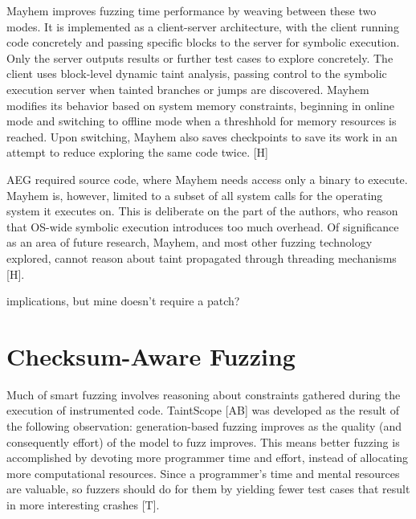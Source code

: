 \documentclass[11pt,expanded,copyright]{fsuthesis}
\begin{document}
Mayhem improves fuzzing time performance by weaving between these two modes. It is implemented as a client-server architecture, with the client running code concretely and passing specific blocks to the server for symbolic execution. Only the server outputs results or further test cases to explore concretely. The client uses block-level dynamic taint analysis, passing control to the symbolic execution server when tainted branches or jumps are discovered. Mayhem modifies its behavior based on system memory constraints, beginning in online mode and switching to offline mode when a threshhold for memory resources is reached. Upon switching, Mayhem also saves checkpoints to save its work in an attempt to reduce exploring the same code twice. [H]

AEG required source code, where Mayhem needs access only a binary to execute. Mayhem is, however, limited to a subset of all system calls for the operating system it executes on. This is deliberate on the part of the authors, who reason that OS-wide symbolic execution introduces too much overhead. Of significance as an area of future research, Mayhem, and most other fuzzing technology explored, cannot reason about taint propagated through threading mechanisms [H].


implications, but mine doesn't require a patch?


\section{Checksum-Aware Fuzzing}

Much of smart fuzzing involves reasoning about constraints gathered during the execution of instrumented code. TaintScope [AB] was developed as the result of the following observation: generation-based fuzzing improves as the quality (and consequently effort) of the model to fuzz improves. This means better fuzzing is accomplished by devoting more programmer time and effort, instead of allocating more computational resources. Since a programmer's time and mental resources are valuable, so fuzzers should do for them by yielding fewer test cases that result in more interesting crashes [T].
\end{document}
